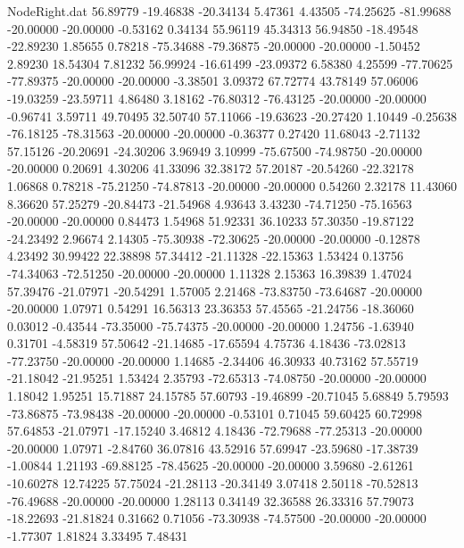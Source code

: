 \begin{filecontents}{NodeRight.dat}
  56.89779  -19.46838  -20.34134     5.47361    4.43505  -74.25625  -81.99688  -20.00000  -20.00000   -0.53162    0.34134   55.96119   45.34313
  56.94850  -18.49548  -22.89230     1.85655    0.78218  -75.34688  -79.36875  -20.00000  -20.00000   -1.50452    2.89230   18.54304    7.81232
  56.99924  -16.61499  -23.09372     6.58380    4.25599  -77.70625  -77.89375  -20.00000  -20.00000   -3.38501    3.09372   67.72774   43.78149
  57.06006  -19.03259  -23.59711     4.86480    3.18162  -76.80312  -76.43125  -20.00000  -20.00000   -0.96741    3.59711   49.70495   32.50740
  57.11066  -19.63623  -20.27420     1.10449   -0.25638  -76.18125  -78.31563  -20.00000  -20.00000   -0.36377    0.27420   11.68043   -2.71132
  57.15126  -20.20691  -24.30206     3.96949    3.10999  -75.67500  -74.98750  -20.00000  -20.00000    0.20691    4.30206   41.33096   32.38172
  57.20187  -20.54260  -22.32178     1.06868    0.78218  -75.21250  -74.87813  -20.00000  -20.00000    0.54260    2.32178   11.43060    8.36620
  57.25279  -20.84473  -21.54968     4.93643    3.43230  -74.71250  -75.16563  -20.00000  -20.00000    0.84473    1.54968   51.92331   36.10233
  57.30350  -19.87122  -24.23492     2.96674    2.14305  -75.30938  -72.30625  -20.00000  -20.00000   -0.12878    4.23492   30.99422   22.38898
  57.34412  -21.11328  -22.15363     1.53424    0.13756  -74.34063  -72.51250  -20.00000  -20.00000    1.11328    2.15363   16.39839    1.47024
  57.39476  -21.07971  -20.54291     1.57005    2.21468  -73.83750  -73.64687  -20.00000  -20.00000    1.07971    0.54291   16.56313   23.36353
  57.45565  -21.24756  -18.36060     0.03012   -0.43544  -73.35000  -75.74375  -20.00000  -20.00000    1.24756   -1.63940    0.31701   -4.58319
  57.50642  -21.14685  -17.65594     4.75736    4.18436  -73.02813  -77.23750  -20.00000  -20.00000    1.14685   -2.34406   46.30933   40.73162
  57.55719  -21.18042  -21.95251     1.53424    2.35793  -72.65313  -74.08750  -20.00000  -20.00000    1.18042    1.95251   15.71887   24.15785
  57.60793  -19.46899  -20.71045     5.68849    5.79593  -73.86875  -73.98438  -20.00000  -20.00000   -0.53101    0.71045   59.60425   60.72998
  57.64853  -21.07971  -17.15240     3.46812    4.18436  -72.79688  -77.25313  -20.00000  -20.00000    1.07971   -2.84760   36.07816   43.52916
  57.69947  -23.59680  -17.38739    -1.00844    1.21193  -69.88125  -78.45625  -20.00000  -20.00000    3.59680   -2.61261  -10.60278   12.74225
  57.75024  -21.28113  -20.34149     3.07418    2.50118  -70.52813  -76.49688  -20.00000  -20.00000    1.28113    0.34149   32.36588   26.33316
  57.79073  -18.22693  -21.81824     0.31662    0.71056  -73.30938  -74.57500  -20.00000  -20.00000   -1.77307    1.81824    3.33495    7.48431

\end{filecontents}
